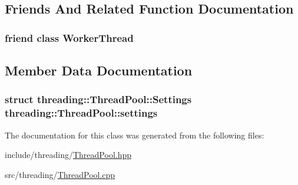 \subsection{Friends And Related Function Documentation}
\hypertarget{classthreading_1_1ThreadPool_a5cd181bfe09cfad66e8f3d87feef1439}{
\subsubsection[{Worker\-Thread}]{\setlength{\rightskip}{0pt plus 5cm}friend class {\bf Worker\-Thread}\hspace{0.3cm}{\ttfamily [friend]}}}\label{classthreading_1_1ThreadPool_a5cd181bfe09cfad66e8f3d87feef1439}


\subsection{Member Data Documentation}
\hypertarget{classthreading_1_1ThreadPool_ae5fd502669f7843a2f014a3a69d4e162}{
\subsubsection[{settings}]{\setlength{\rightskip}{0pt plus 5cm}struct {\bf threading\-::\-Thread\-Pool\-::\-Settings}  threading\-::\-Thread\-Pool\-::settings}}\label{classthreading_1_1ThreadPool_ae5fd502669f7843a2f014a3a69d4e162}


The documentation for this class was generated from the following files\-:\begin{DoxyCompactItemize}
\item 
include/threading/\hyperlink{ThreadPool_8hpp}{Thread\-Pool.\-hpp}\item 
src/threading/\hyperlink{ThreadPool_8cpp}{Thread\-Pool.\-cpp}\end{DoxyCompactItemize}
